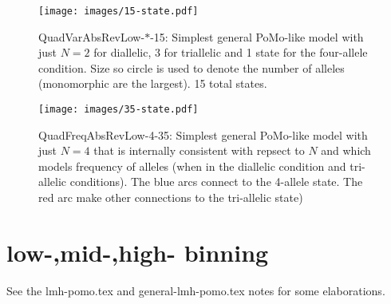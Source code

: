 \documentclass{llncs}
\newcommand{\virtPopSize}{\ensuremath{N}}
\newcommand{\pomo}{PoMo\xspace}
\begin{document}
\begin{figure}
    \begin{center}
        \texttt{[image: images/15-state.pdf]}
        \caption{QuadVarAbsRevLow-$\ast$-15: Simplest general \pomo-like model with just $\virtPopSize=2$ for diallelic, 3 for triallelic and 1 state for the four-allele condition. Size so circle is used to denote the number of alleles (monomorphic are the largest). 15 total states.}\label{pomoQuadVarAbsRevLow}
    \end{center}
\end{figure}

\begin{figure}
    \begin{center}
        \texttt{[image: images/35-state.pdf]}
        \caption{QuadFreqAbsRevLow-4-35: Simplest general \pomo-like model with just $\virtPopSize=4$ that is internally consistent with repsect to $\virtPopSize$ and which models frequency of alleles (when in the diallelic condition and tri-allelic conditions). The blue arcs connect to the 4-allele state. The red arc  make other connections to the tri-allelic state)}\label{pomoQuadVarAbsRevLow}
    \end{center}
\end{figure}

\newpage
\section*{low-,mid-,high- binning}
See the lmh-pomo.tex and general-lmh-pomo.tex notes for some elaborations.



\end{document}
